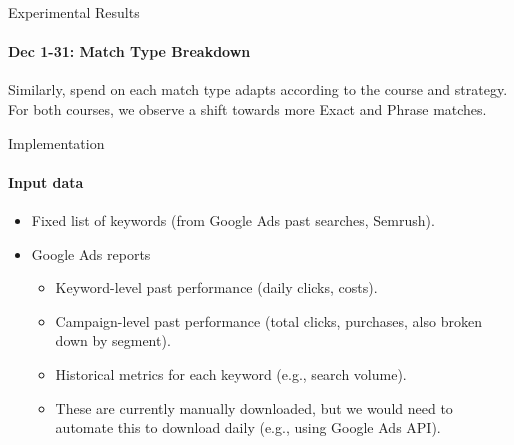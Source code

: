 \documentclass[smaller]{beamer}
\begin{document}
\begin{frame}{Experimental Results}
\framesubtitle{Dec 1-31: Match Type Breakdown}

Similarly, spend on each match type adapts according to the course and strategy.
For both courses, we observe a shift towards more Exact and Phrase matches.

\begin{table}[htbp]
  \centering
\end{table}

\end{frame}


\begin{frame}{Implementation}
\framesubtitle{Input data}
\begin{itemize}
    \item Fixed list of keywords (from Google Ads past searches, Semrush).
    \item Google Ads reports
    \begin{itemize}
        \item Keyword-level past performance (daily clicks, costs).
        \item Campaign-level past performance (total clicks, purchases, also broken down by segment).
        \item Historical metrics for each keyword (e.g., search volume).
        \item These are currently manually downloaded, but we would need to automate
        this to download daily (e.g., using Google Ads API).
    \end{itemize}
\end{itemize}
\end{frame}
\end{document}
